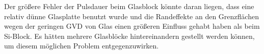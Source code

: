 Der größere Fehler der Pulsdauer beim Glasblock könnte daran liegen, dass eine relativ dünne Glasplatte benutzt wurde und die Randeffekte an den Grenzflächen wegen der geringen GVD von Glas einen größeren Einfluss gehabt haben als beim Si-Block.
Es hätten mehrere Glasblöcke hintereinandern gestellt werden können, um diesem möglichen Problem entgegenzuwirken.

